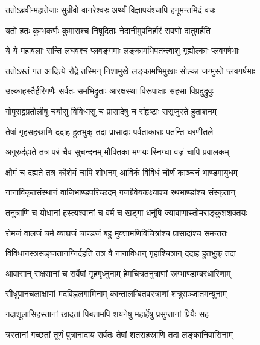 
\twolineshloka
{ततोऽब्रवीन्महातेजाः सुग्रीवो वानरेश्वरः}
{अर्थ्यं विज्ञापयंश्चापि हनूमन्तमिदं वचः} %

\twolineshloka
{यतो हतः कुम्भकर्णः कुमाराश्च निषूदिताः}
{नेदानीमुपनिर्हारं रावणो दातुमर्हति} %

\twolineshloka
{ये ये महाबलाः सन्ति लघवश्च प्लवङ्गमाः}
{लङ्कामभिपतन्त्वाशु गृह्योल्काः प्लवगर्षभाः} %

\twolineshloka
{ततोऽस्तं गत आदित्ये रौद्रे तस्मिन् निशामुखे}
{लङ्कामभिमुखाः सोल्का जग्मुस्ते प्लवगर्षभाः} %

\twolineshloka
{उल्काहस्तैर्हरिगणैः सर्वतः समभिद्रुताः}
{आरक्षस्था विरूपाक्षाः सहसा विप्रदुद्रुवुः} %

\twolineshloka
{गोपुराट्टप्रतोलीषु चर्यासु विविधासु च}
{प्रासादेषु च संहृष्टाः ससृजुस्ते हुताशनम्} %

\twolineshloka
{तेषां गृहसहस्राणि ददाह हुतभुक् तदा}
{प्रासादाः पर्वताकाराः पतन्ति धरणीतले} %

\twolineshloka
{अगुरुर्दह्यते तत्र परं चैव सुचन्दनम्}
{मौक्तिका मणयः स्निग्धा वज्रं चापि प्रवालकम्} %

\twolineshloka
{क्षौमं च दह्यते तत्र कौशेयं चापि शोभनम्}
{आविकं विविधं चौर्णं काञ्चनं भाण्डमायुधम्} %

\twolineshloka
{नानाविकृतसंस्थानं वाजिभाण्डपरिच्छदम्}
{गजग्रैवेयकक्ष्याश्च रथभाण्डांश्च संस्कृतान्} %

\twolineshloka
{तनुत्राणि च योधानां हस्त्यश्वानां च वर्म च}
{खड्गा धनूंषि ज्याबाणास्तोमराङ्कुशशक्तयः} %

\twolineshloka
{रोमजं वालजं चर्म व्याघ्रजं चाण्डजं बहु}
{मुक्तामणिविचित्रांश्च प्रासादांश्च समन्ततः} %

\twolineshloka
{विविधानस्त्रसङ्घातानग्निर्दहति तत्र वै}
{नानाविधान् गृहांश्चित्रान् ददाह हुतभुक् तदा} %

\twolineshloka
{आवासान् राक्षसानां च सर्वेषां गृहगृध्नुनाम्}
{हेमचित्रतनुत्राणां स्रग्भाण्डाम्बरधारिणाम्} %

\twolineshloka
{सीधुपानचलाक्षाणां मदविह्वलगामिनाम्}
{कान्तालम्बितवस्त्राणां शत्रुसञ्जातमन्युनाम्} %

\twolineshloka
{गदाशूलासिहस्तानां खादतां पिबतामपि}
{शयनेषु महार्हेषु प्रसुप्तानां प्रियैः सह} %

\twolineshloka
{त्रस्तानां गच्छतां तूर्णं पुत्रानादाय सर्वतः}
{तेषां शतसहस्राणि तदा लङ्कानिवासिनाम्} %


